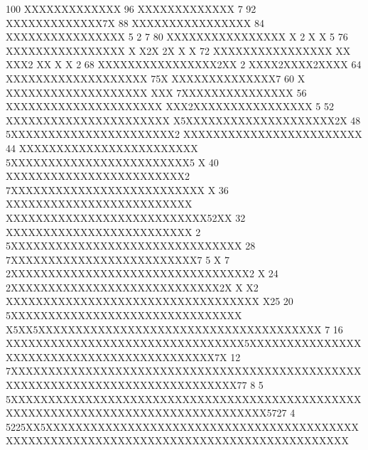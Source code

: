 \begin{Listing}
      100                              XXXXXXXXXXXXX
       96                              XXXXXXXXXXXXX 7
       92                              XXXXXXXXXXXXX7X
       88                             XXXXXXXXXXXXXXXX
       84                             XXXXXXXXXXXXXXXX 5                              2 7
       80                             XXXXXXXXXXXXXXXX X                        2     X X  5
       76                             XXXXXXXXXXXXXXXX X                        X2X  2X X  X
       72                             XXXXXXXXXXXXXXXX XX                       XXX2 XX X  X 2
       68                             XXXXXXXXXXXXXXXX2XX                    2  XXXX2XXXX2XXXX
       64                             XXXXXXXXXXXXXXXXXXX                  75X  XXXXXXXXXXXXXX7
       60                           X XXXXXXXXXXXXXXXXXXX                  XXX 7XXXXXXXXXXXXXXX
       56                           XXXXXXXXXXXXXXXXXXXXX                  XXX2XXXXXXXXXXXXXXXX 5
       52                           XXXXXXXXXXXXXXXXXXXXXX               X5XXXXXXXXXXXXXXXXXXXX2X
       48                          5XXXXXXXXXXXXXXXXXXXXXX2              XXXXXXXXXXXXXXXXXXXXXXXX
       44                          XXXXXXXXXXXXXXXXXXXXXXXX             5XXXXXXXXXXXXXXXXXXXXXXXX5  X
       40                          XXXXXXXXXXXXXXXXXXXXXXXX2           7XXXXXXXXXXXXXXXXXXXXXXXXXX  X
       36                          XXXXXXXXXXXXXXXXXXXXXXXXX           XXXXXXXXXXXXXXXXXXXXXXXXXXX52XX
       32                          XXXXXXXXXXXXXXXXXXXXXXXXX    2     5XXXXXXXXXXXXXXXXXXXXXXXXXXXXXXX
       28                         7XXXXXXXXXXXXXXXXXXXXXXXXX7 5 X 7  2XXXXXXXXXXXXXXXXXXXXXXXXXXXXXXXX2 X
       24                       2XXXXXXXXXXXXXXXXXXXXXXXXXXXX2X X X2 XXXXXXXXXXXXXXXXXXXXXXXXXXXXXXXXXX X25
       20                      5XXXXXXXXXXXXXXXXXXXXXXXXXXXXXXX X5XX5XXXXXXXXXXXXXXXXXXXXXXXXXXXXXXXXXXXXXX 7
       16                      XXXXXXXXXXXXXXXXXXXXXXXXXXXXXXXX5XXXXXXXXXXXXXXXXXXXXXXXXXXXXXXXXXXXXXXXXXXX7X
       12                     7XXXXXXXXXXXXXXXXXXXXXXXXXXXXXXXXXXXXXXXXXXXXXXXXXXXXXXXXXXXXXXXXXXXXXXXXXXXXXX77
        8                 5 5XXXXXXXXXXXXXXXXXXXXXXXXXXXXXXXXXXXXXXXXXXXXXXXXXXXXXXXXXXXXXXXXXXXXXXXXXXXXXXXXXX5727
        4            5225XX5XXXXXXXXXXXXXXXXXXXXXXXXXXXXXXXXXXXXXXXXXXXXXXXXXXXXXXXXXXXXXXXXXXXXXXXXXXXXXXXXXXXXXXXX
 

\end{Listing}
